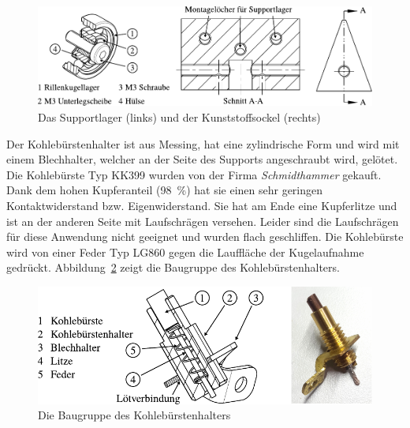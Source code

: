 \begin{figure}[htb]
    \centering
    \includegraphics[]{./images/kugelsupport.pdf}
    \caption{Das Supportlager (links) und der Kunststoffsockel (rechts)}
    \label{fig:das_modifizierte_kugelsupport}
\end{figure}

Der Kohlebürstenhalter ist aus Messing, hat eine zylindrische Form und wird mit einem Blechhalter, welcher an der Seite des Supports angeschraubt wird, gelötet.
Die Kohlebürste Typ KK399 wurden von der Firma \textit{Schmidthammer} gekauft.
Dank dem hohen Kupferanteil (\SI{98}{\percent}) hat sie einen sehr geringen Kontaktwiderstand bzw. Eigenwiderstand.
Sie hat am Ende eine Kupferlitze und ist an der anderen Seite mit Laufschrägen versehen.
Leider sind die Laufschrägen für diese Anwendung nicht geeignet und wurden flach geschliffen.
Die Kohlebürste wird von einer Feder Typ LG860 gegen die Lauffläche der Kugelaufnahme gedrückt.
Abbildung~\ref{fig:die_baugruppe_des_kohlebuerstenhalters} zeigt die Baugruppe des Kohlebürstenhalters.

\begin{figure}[htb]
    \centering
    \includegraphics[]{./images/kohlebuerstenhalter_asm.pdf}
    \caption{Die Baugruppe des Kohlebürstenhalters}
    \label{fig:die_baugruppe_des_kohlebuerstenhalters}
\end{figure}

